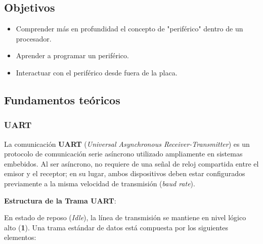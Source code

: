 \documentclass[../main.tex]{subfiles}
\begin{document}

    \subsection{Objetivos}
        \begin{itemize}
            \item Comprender más en profundidad el concepto de "periférico" dentro de un procesador.
            \item Aprender a programar un periférico.
            \item Interactuar con el periférico desde fuera de la placa.
        \end{itemize}

    \subsection{Fundamentos teóricos}

        \subsubsection{UART}

            La comunicación \textbf{UART} (\textit{Universal Asynchronous Receiver-Transmitter}) es un protocolo de comunicación serie asíncrono utilizado ampliamente en sistemas embebidos. Al ser asíncrono, no requiere de una señal de reloj compartida entre el emisor y el receptor; en su lugar, ambos dispositivos deben estar configurados previamente a la misma velocidad de transmisión (\textit{baud rate}).

            \textbf{Estructura de la Trama UART}: 
            
            En estado de reposo (\textit{Idle}), la línea de transmisión se mantiene en nivel lógico alto (\textbf{1}). Una trama estándar de datos está compuesta por los siguientes elementos:
\end{document}
